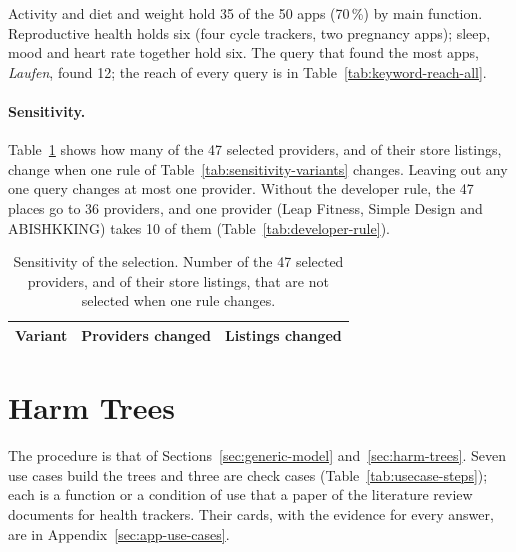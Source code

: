 Activity and diet and weight hold 35 of the 50 apps (70\,\%) by main function. Reproductive health
holds six (four cycle trackers, two pregnancy apps); sleep, mood and heart rate together hold six.
The query that found the most apps, \emph{Laufen}, found 12; the reach of every query is in
Table~\ref{tab:keyword-reach-all}.

\paragraph{Sensitivity.} Table~\ref{tab:sensitivity} shows how many of the 47 selected providers,
and of their store listings, change when one rule of Table~\ref{tab:sensitivity-variants} changes.
Leaving out any one query changes at most one provider. Without the developer rule, the 47 places
go to 36 providers, and one provider (Leap Fitness, Simple Design and ABISHKKING) takes 10 of them
(Table~\ref{tab:developer-rule}).

\begin{table}[H]
\centering
\begin{singlespace}
\caption[Sensitivity of the selection]{Sensitivity of the selection. Number of the 47 selected providers, and
of their store listings, that are not selected when one rule changes.}
\label{tab:sensitivity}
\small
\begin{tabularx}{\textwidth}{@{}Xrr@{}}
\toprule
\textbf{Variant} & \textbf{Providers changed} & \textbf{Listings changed} \\
\midrule
\end{tabularx}
\end{singlespace}
\end{table}

\section{Harm Trees}
\label{sec:results-model}
The procedure is that of Sections~\ref{sec:generic-model} and~\ref{sec:harm-trees}. Seven use
cases build the trees and three are check cases (Table~\ref{tab:usecase-steps}); each is a
function or a condition of use that a paper of the literature review documents for health
trackers. Their cards, with the evidence for every answer, are in
Appendix~\ref{sec:app-use-cases}.

